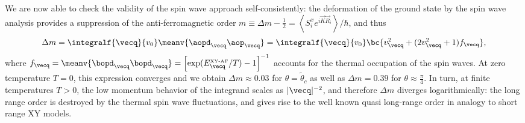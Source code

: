 We are now able to check the validity of the spin wave approach self-consistently: the deformation of the ground state by the spin wave analysis
provides a suppression of the anti-ferromagnetic order $ m \equiv  \Delta m - \frac{1}{2}=\left\langle S^x_i e^{i {\vec K} {\vec R_i}} \right\rangle / \hbar$,
and thus
%
\begin{align}
    \Delta m= \integralf{\vecq}{v_0} \meanv{ \aopd_{\vecq} \aop_{\vecq} } = \integralf{\vecq}{v_0}  \bc{ v_{\vecq}^2 + (2 v_{\vecq}^2 + 1) f_{\vecq} },
\end{align}
%
where $f_{\vecq} = \meanv{ \bopd_\vecq \bopd_\vecq } = \left[\exp(E^{\mbox{\tiny XY-AF}}_{\vecq}/ T)-1\right]^{-1}$ accounts for the thermal occupation of the spin waves. At zero temperature $T=0$, this expression converges and  we obtain $\Delta m \approx 0.03$ for $\theta = \tilde\theta_c$ as well as $\Delta m = 0.39$ for $\theta \approx \frac{\pi}{4}$. In turn, at finite temperatures $T>0$, the low momentum behavior of  the integrand scales as $|{\vecq}|^{-2}$, and therefore $\Delta m$ diverges logarithmically: the long range order is destroyed by the thermal spin wave fluctuations, and gives rise to the well known
quasi long-range order in analogy to short range XY models.

